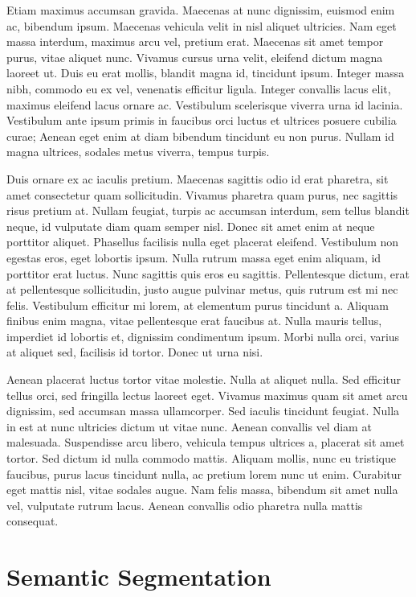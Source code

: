 \documentclass[
  letterpaper,
  DIV=11,
  numbers=noendperiod]{scrreprt}
\begin{document}
Etiam maximus accumsan gravida. Maecenas at nunc dignissim, euismod enim
ac, bibendum ipsum. Maecenas vehicula velit in nisl aliquet ultricies.
Nam eget massa interdum, maximus arcu vel, pretium erat. Maecenas sit
amet tempor purus, vitae aliquet nunc. Vivamus cursus urna velit,
eleifend dictum magna laoreet ut. Duis eu erat mollis, blandit magna id,
tincidunt ipsum. Integer massa nibh, commodo eu ex vel, venenatis
efficitur ligula. Integer convallis lacus elit, maximus eleifend lacus
ornare ac. Vestibulum scelerisque viverra urna id lacinia. Vestibulum
ante ipsum primis in faucibus orci luctus et ultrices posuere cubilia
curae; Aenean eget enim at diam bibendum tincidunt eu non purus. Nullam
id magna ultrices, sodales metus viverra, tempus turpis.

Duis ornare ex ac iaculis pretium. Maecenas sagittis odio id erat
pharetra, sit amet consectetur quam sollicitudin. Vivamus pharetra quam
purus, nec sagittis risus pretium at. Nullam feugiat, turpis ac accumsan
interdum, sem tellus blandit neque, id vulputate diam quam semper nisl.
Donec sit amet enim at neque porttitor aliquet. Phasellus facilisis
nulla eget placerat eleifend. Vestibulum non egestas eros, eget lobortis
ipsum. Nulla rutrum massa eget enim aliquam, id porttitor erat luctus.
Nunc sagittis quis eros eu sagittis. Pellentesque dictum, erat at
pellentesque sollicitudin, justo augue pulvinar metus, quis rutrum est
mi nec felis. Vestibulum efficitur mi lorem, at elementum purus
tincidunt a. Aliquam finibus enim magna, vitae pellentesque erat
faucibus at. Nulla mauris tellus, imperdiet id lobortis et, dignissim
condimentum ipsum. Morbi nulla orci, varius at aliquet sed, facilisis id
tortor. Donec ut urna nisi.

Aenean placerat luctus tortor vitae molestie. Nulla at aliquet nulla.
Sed efficitur tellus orci, sed fringilla lectus laoreet eget. Vivamus
maximus quam sit amet arcu dignissim, sed accumsan massa ullamcorper.
Sed iaculis tincidunt feugiat. Nulla in est at nunc ultricies dictum ut
vitae nunc. Aenean convallis vel diam at malesuada. Suspendisse arcu
libero, vehicula tempus ultrices a, placerat sit amet tortor. Sed dictum
id nulla commodo mattis. Aliquam mollis, nunc eu tristique faucibus,
purus lacus tincidunt nulla, ac pretium lorem nunc ut enim. Curabitur
eget mattis nisl, vitae sodales augue. Nam felis massa, bibendum sit
amet nulla vel, vulputate rutrum lacus. Aenean convallis odio pharetra
nulla mattis consequat.

\part{Semantic Segmentation}
\end{document}
